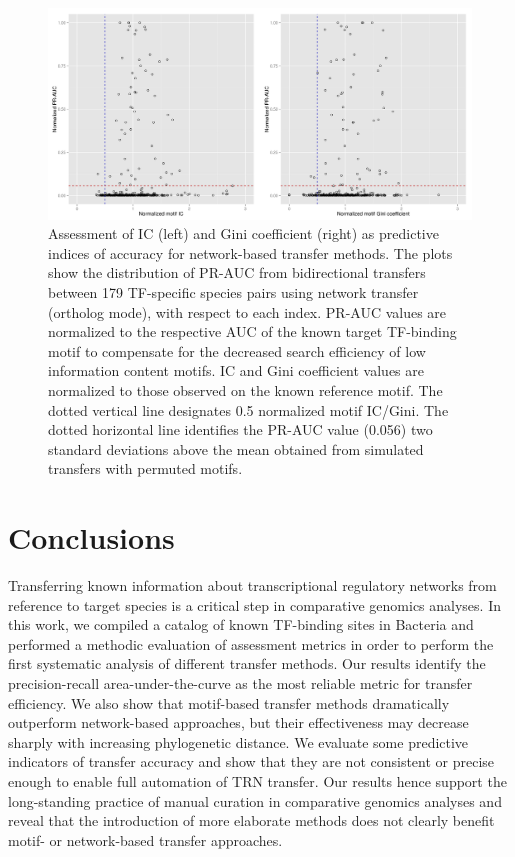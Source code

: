 \begin{figure}
  \centering
  \includegraphics[width=\textwidth]{figures/chapter3/ic-and-gini}
  \caption{Assessment of IC (left) and Gini coefficient (right) as predictive
    indices of accuracy for network-based transfer methods. The plots show the
    distribution of PR-AUC from bidirectional transfers between 179 TF-specific
    species pairs using network transfer (ortholog mode), with respect
    to each index. PR-AUC values are normalized to the respective AUC of the
    known target TF-binding motif to compensate for the decreased search
    efficiency of low information content motifs. IC and Gini coefficient
    values are normalized to those observed on the known reference motif. The
    dotted vertical line designates 0.5 normalized motif IC/Gini. The dotted
    horizontal line identifies the PR-AUC value (0.056) two standard deviations
    above the mean obtained from simulated transfers with permuted motifs.
  }
\label{fig:ic-and-gini}
\end{figure}

\section{Conclusions}

Transferring known information about transcriptional regulatory networks from
reference to target species is a critical step in comparative genomics
analyses. In this work, we compiled a catalog of known TF-binding sites in
Bacteria and performed a methodic evaluation of assessment metrics in order to
perform the first systematic analysis of different transfer methods. Our
results identify the precision-recall area-under-the-curve as the most reliable
metric for transfer efficiency. We also show that motif-based transfer methods
dramatically outperform network-based approaches, but their effectiveness may
decrease sharply with increasing phylogenetic distance. We evaluate some
predictive indicators of transfer accuracy and show that they are not
consistent or precise enough to enable full automation of TRN transfer. Our
results hence support the long-standing practice of manual curation in
comparative genomics analyses and reveal that the introduction of more
elaborate methods does not clearly benefit motif- or network-based transfer
approaches.

